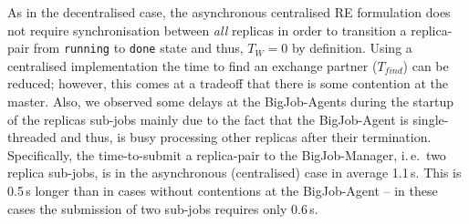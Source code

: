\documentclass{rspublic}
\newcommand{\jhanote}[1]{ {\textcolor{red} { ***shantenu: #1 }}}
\newcommand{\alnote}[1]{ {\textcolor{blue} { ***andre: #1 }}}
\newcommand{\athotanote}[1]{ {\textcolor{green} { ***athota: #1 }}}
\newcommand{\alnote}[1]{}
\newcommand{\athotanote}[1]{}
\newcommand{\jhanote}[1]{}
\begin{document}
As in the decentralised case, the asynchronous centralised RE
formulation does not require synchronisation between {\it all} replicas
in order to transition a replica-pair from \texttt{run\-ning} to
\texttt{done} state and thus, $T_W = 0$ by definition. Using a centralised
implementation the time to find an exchange partner ($T_{find}$) can be
reduced; however, this comes at a tradeoff that there is some
contention at the master. Also, we observed some delays at the BigJob-Agents 
during the startup of the replicas sub-jobs mainly due to the
fact that the BigJob-Agent is single-threaded and thus, is busy
processing other replicas after their termination.  Specifically, the
time-to-submit a replica-pair to the BigJob-Manager, 
i.\,e.\ two replica sub-jobs, is in the asynchronous (centralised) case 
in average 1.1\,s. This is 0.5\,s longer than in cases
without contentions at the BigJob-Agent -- in these cases the submission
of two sub-jobs requires only 0.6\,s.
\end{document}
